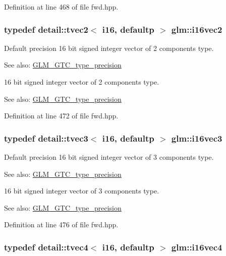 Definition at line 468 of file fwd.hpp.\hypertarget{group__gtc__type__precision_g13f7a88281faec6a72231dce73ce6129}{
\subsubsection[i16vec2]{\setlength{\rightskip}{0pt plus 5cm}typedef detail::tvec2$<$ i16, defaultp $>$ {\bf glm::i16vec2}}}
\label{group__gtc__type__precision_g13f7a88281faec6a72231dce73ce6129}


Default precision 16 bit signed integer vector of 2 components type. \begin{Desc}
\item[See also:]\hyperlink{group__gtc__type__precision}{GLM\_\-GTC\_\-type\_\-precision}\end{Desc}
16 bit signed integer vector of 2 components type. \begin{Desc}
\item[See also:]\hyperlink{group__gtc__type__precision}{GLM\_\-GTC\_\-type\_\-precision} \end{Desc}


Definition at line 472 of file fwd.hpp.\hypertarget{group__gtc__type__precision_g22ec113d49837ef823048bb01511564c}{
\subsubsection[i16vec3]{\setlength{\rightskip}{0pt plus 5cm}typedef detail::tvec3$<$ i16, defaultp $>$ {\bf glm::i16vec3}}}
\label{group__gtc__type__precision_g22ec113d49837ef823048bb01511564c}


Default precision 16 bit signed integer vector of 3 components type. \begin{Desc}
\item[See also:]\hyperlink{group__gtc__type__precision}{GLM\_\-GTC\_\-type\_\-precision}\end{Desc}
16 bit signed integer vector of 3 components type. \begin{Desc}
\item[See also:]\hyperlink{group__gtc__type__precision}{GLM\_\-GTC\_\-type\_\-precision} \end{Desc}


Definition at line 476 of file fwd.hpp.\hypertarget{group__gtc__type__precision_g28cd96ac55e2209bdbd3a41cb8af970a}{
\subsubsection[i16vec4]{\setlength{\rightskip}{0pt plus 5cm}typedef detail::tvec4$<$ i16, defaultp $>$ {\bf glm::i16vec4}}}
\label{group__gtc__type__precision_g28cd96ac55e2209bdbd3a41cb8af970a}


